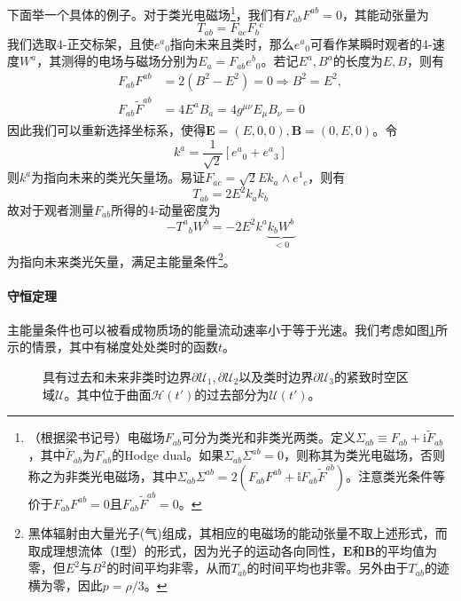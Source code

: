 \documentclass[hyperref, UTF8, a4paper]{ctexart}
\begin{document}
下面举一个具体的例子。对于类光电磁场\footnote{（根据梁书记号）电磁场$F_{ab}$可分为类光和非类光两类。定义$\Sigma _{ab} \equiv F_{ab} +\mathrm{i}\tilde{F}_{ab}$，其中$\tilde{F}_{ab}$为$F_{ab}$的Hodge dual。如果$\Sigma _{ab} \Sigma ^{ab} =0$，则称其为类光电磁场，否则称之为非类光电磁场，其中$\Sigma _{ab} \Sigma ^{ab} =2\left( F_{ab} F^{ab} +\mathbb{i} F_{ab}\tilde{F}^{ab}\right)$。注意类光条件等价于$F_{ab} F^{ab} =0$且$F_{ab}\tilde{F}^{ab} =0$。}，我们有$F_{ab} F^{ab} =0$，其能动张量为
\begin{equation*}
	T_{ab} =F_{ac} F{_{b}}^{c}
\end{equation*}
我们选取4-正交标架，且使$e^{a}{}_{0}$指向未来且类时，那么$e^{a}{}_{0}$可看作某瞬时观者的4-速度$W^{a}$，其测得的电场与磁场分别为$E_{a} =F_{ab} e^{b}{}_{0}$。若记$E^{a} ,B^{a}$的长度为$E,B$，则有
\begin{equation*}
	\begin{aligned}
		F_{ab} F^{ab} & =2\left( B^{2} -E^{2}\right) =0\Rightarrow B^{2} =E^{2} ,\\
		F_{ab}\tilde{F}^{ab} & =4E^{a} B_{a} =4g^{\mu \nu } E_{\mu } B_{\nu } =0
	\end{aligned}
\end{equation*}
因此我们可以重新选择坐标系，使得$\boldsymbol{E} =( E,0,0) ,\boldsymbol{B} =( 0,E,0)$。令
\begin{equation*}
	k^{a} =\frac{1}{\sqrt{2}}\left[ e^{a}{}_{0} +e^{a}{}_{3}\right]
\end{equation*}
则$k^{a}$为指向未来的类光矢量场。易证$F_{ac} =\sqrt{2} Ek_{a} \land e^{1}{}_{c}$，则有
\begin{equation*}
	T_{ab} =2E^{2} k_{a} k_{b}
\end{equation*}
故对于观者测量$F_{ab}$所得的4-动量密度为
\begin{equation*}
	-T^{a}{}_{b} W^{b} =-2E^{2} k^{a}\underbrace{k_{b} W^{b}}_{< 0}
\end{equation*}
为指向未来类光矢量，满足主能量条件\footnote{黑体辐射由大量光子(气)组成，其相应的电磁场的能动张量不取上述形式，而取成理想流体（I型）的形式，因为光子的运动各向同性，$\boldsymbol{E}$和$\boldsymbol{B}$的平均值为零，但$E^{2}$与$B^{2}$的时间平均非零，从而$T_{ab}$的时间平均也非零。另外由于$T_{ab}$的迹横为零，因此$p=\rho /3$。}。
\paragraph{守恒定理}

主能量条件也可以被看成物质场的能量流动速率小于等于光速。我们考虑如图\ref{constant_theorem}所示的情景，其中有梯度处处类时的函数$t$。
\begin{figure}
	\centering
	
	
	
	\caption{具有过去和未来非类时边界$\partial \mathscr{U}_{1} ,\partial \mathscr{U}_{2}$以及类时边界$\partial \mathscr{U}_{3}$的紧致时空区域$\mathscr{U}$。其中位于曲面$\mathscr{H}( t')$的过去部分为$\mathscr{U}( t')$。}
	
	\label{constant_theorem}
\end{figure}
\end{document}

